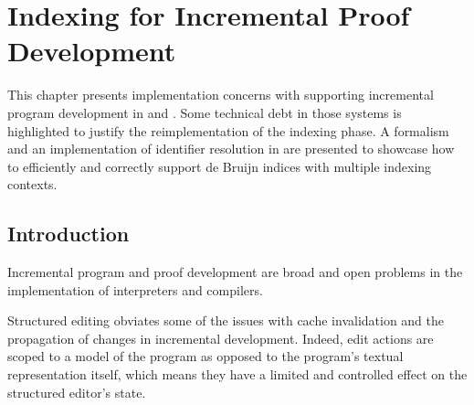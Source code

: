 \chapter{Indexing for Incremental Proof Development}

\newcommand{\private}[1]{#1_\downarrow}
\newcommand{\public}[1]{#1_\uparrow}
\newcommand{\Private}[1]{#1_\Downarrow}
\newcommand{\Public}[1]{#1_\Uparrow}
\newcommand{\Env}{\Xi}
\newcommand{\Scope}{\mathbb{S}}
\newcommand{\Module}{\mathbb{M}}
\newcommand{\Pattern}{\mathbb{P}}
\newcommand{\Entry}{\mathbb{E}}
\newcommand{\Var}{\mathbb{V}}
\newcommand{\Constant}{\mathbb{C}}
\newcommand{\Fail}{\lightning}
\newcommand{\Lookup}[2]{\operatorname{lookup}\left[#1\right]\left(#2\right)}
\newcommand{\Domain}{\operatorname{domain}}
\newcommand{\Pop}[2]{\operatorname{pop}\left[#1\right]\left(#2\right)}
\newcommand{\Translates}{\rightsquigarrow}

This chapter presents implementation concerns with supporting incremental program development in \Beluga and \Harpoon.
Some technical debt in those systems is highlighted to justify the reimplementation of the indexing phase.
A formalism and an implementation of identifier resolution in \Beluga are presented to showcase how to efficiently and correctly support de Bruijn indices with multiple indexing contexts.

\section{Introduction}


Incremental program and proof development are broad and open problems in the implementation of interpreters and compilers.

Structured editing obviates some of the issues with cache invalidation and the propagation of changes in incremental development.
Indeed, edit actions are scoped to a model of the program as opposed to the program's textual representation itself, which means they have a limited and controlled effect on the structured editor's state.



